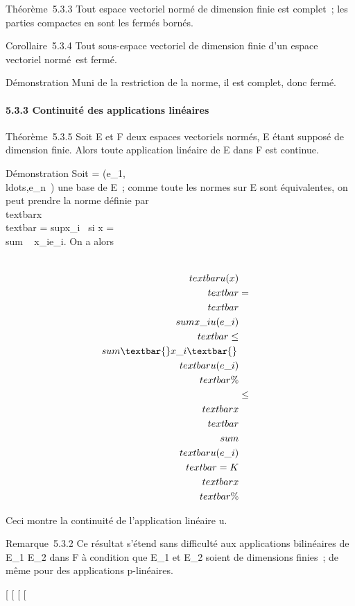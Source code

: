 \documentclass[]{article}
\begin{document}
Théorème~5.3.3 Tout espace vectoriel normé de dimension finie est
complet~; les parties compactes en sont les fermés bornés.

Corollaire~5.3.4 Tout sous-espace vectoriel de dimension finie d'un
espace vectoriel normé~est fermé.

Démonstration Muni de la restriction de la norme, il est complet, donc
fermé.

\paragraph{5.3.3 Continuité des applications linéaires}

Théorème~5.3.5 Soit E et F deux espaces vectoriels normés, E étant
supposé de dimension finie. Alors toute application linéaire de E dans F
est continue.

Démonstration Soit  =
(e\_1,\\ldots,e\_n~)
une base de E~; comme toute les normes sur E sont équivalentes, on peut
prendre la norme définie par
\\textbar{}x\\textbar{}
= sup\textbar{}x\_i~\textbar{} si x
= \\sum ~
x\_ie\_i. On a alors

\begin{align*}
\\textbar{}u(x)\\textbar{}& =&
\\textbar{}\\sum
x\_iu(e\_i)\\textbar{}
\leq\\sum
\textbar{}x\_i\textbar{}\,\\textbar{}u(e\_i)\\textbar{}\%&
\\ & \leq&
\\textbar{}x\\textbar{}\\sum
\\textbar{}u(e\_i)\\textbar{} =
K\\textbar{}x\\textbar{} \%&
\\ \end{align*}

Ceci montre la continuité de l'application linéaire u.

Remarque~5.3.2 Ce résultat s'étend sans difficulté aux applications
bilinéaires de E\_1 \times E\_2 dans F à condition que
E\_1 et E\_2 soient de dimensions finies~; de même pour
des applications p-linéaires.

{[}
{[}
{[}
{[}
\end{document}
